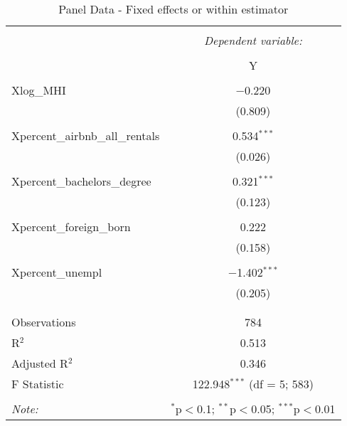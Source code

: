 \documentclass{article}
\begin{document}
\begin{table}[!htbp] \centering 
  \caption{Panel Data - Fixed effects or within estimator} 
  \label{} 
  \begin{tabular}{@{\extracolsep{5pt}}lc} 
    \\[-1.8ex]\hline 
    \hline \\[-1.8ex] 
    & \multicolumn{1}{c}{\textit{Dependent variable:}} \\ 
    \cline{2-2} 
    \\[-1.8ex] & Y \\ 
    \hline \\[-1.8ex] 
    Xlog\_MHI & $-$0.220 \\ 
    & (0.809) \\ 
    & \\ 
    Xpercent\_airbnb\_all\_rentals & 0.534$^{***}$ \\ 
    & (0.026) \\ 
    & \\ 
    Xpercent\_bachelors\_degree & 0.321$^{***}$ \\ 
    & (0.123) \\ 
    & \\ 
    Xpercent\_foreign\_born & 0.222 \\ 
    & (0.158) \\ 
    & \\ 
    Xpercent\_unempl & $-$1.402$^{***}$ \\ 
    & (0.205) \\ 
    & \\ 
    \hline \\[-1.8ex] 
    Observations & 784 \\ 
    R$^{2}$ & 0.513 \\ 
    Adjusted R$^{2}$ & 0.346 \\ 
    F Statistic & 122.948$^{***}$ (df = 5; 583) \\ 
    \hline 
    \hline \\[-1.8ex] 
    \textit{Note:}  & \multicolumn{1}{r}{$^{*}$p$<$0.1; $^{**}$p$<$0.05; $^{***}$p$<$0.01} \\ 
  \end{tabular} 
\end{table}
\end{document}
